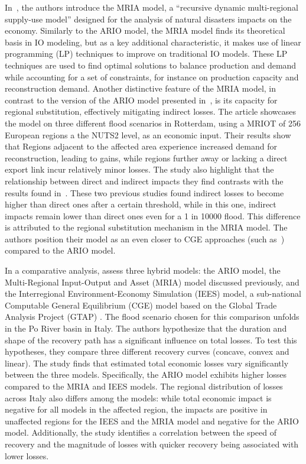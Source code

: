 In~\textcite{koks-2016-multir-impac}, the authors introduce the
\acrfull{MRIA} model, a ``recursive dynamic multi-regional supply-use model''
designed for the analysis of natural disasters impacts on the economy. Similarly to
the ARIO model, the MRIA model finds its theoretical basis in IO modeling, but
as a key additional characteristic, it makes use of linear programming (LP)
techniques to improve on traditional IO models. These LP techniques are used to
find optimal solutions to balance production and demand while accounting for a
set of constraints, for instance on production capacity and reconstruction
demand. Another distinctive feature of the MRIA model, in contrast to the
version of the ARIO model presented in~\textcite{hallegatte-2013-model-role}, is its capacity for regional
substitution, effectively mitigating indirect losses. The article showcases the
model on three different flood scenarios in Rotterdam,
using a MRIOT of 256 European regions a the NUTS2 level, as an economic input.
Their results show that Regions adjacent to the affected area experience
increased demand for reconstruction, leading to gains, while regions further
away or lacking a direct export link incur relatively minor losses. The study
also highlight that the relationship between direct and indirect impacts
they find contrasts with the results found
in~\textcite{koks-2014-integ-direc, hallegatte-2013-model-role}. These two previous studies found
indirect losses to become higher than direct ones after a certain threshold, while
in this one, indirect impacts remain lower than direct ones even for a 1 in
10000 flood. This difference is attributed to the regional substitution
mechanism in the MRIA model. The authors position their model as an even closer
to CGE approaches (such as~\textcite{carrera-2015-asses-direc}) compared to the
ARIO model.

In a comparative analysis, \textcite{koks-2016-region-disas} assess
three hybrid models: the ARIO model, the Multi-Regional Input-Output and Asset
(MRIA) model \parencite{koks-2016-multir-impac} discussed
previously, and the Interregional Environment-Economy Simulation (IEES) model, a
sub-national Computable General Equilibrium (CGE) model based on the Global
Trade Analysis Project (GTAP) \parencite{hertel-1997-global, narayanan-2008-global-trade}. The flood scenario chosen for this comparison
unfolds in the Po River basin in Italy. The authors hypothesize that the duration and shape of the recovery
path has a significant influence on total losses. To test this hypotheses, they
compare three different recovery curves (concave, convex and linear). The study
finds that estimated total economic losses vary significantly between the three
models. Specifically, the ARIO model exhibits higher losses compared to the MRIA and IEES
models. The regional distribution of losses across
Italy also differs among the models: while total economic impact is negative for
all models in the affected region, the impacts are positive in unaffected
regions for the IEES and the MRIA model and negative for the ARIO model.
Additionally, the study identifies a correlation between the speed of
recovery and the magnitude of losses with quicker recovery being associated with lower
losses.



